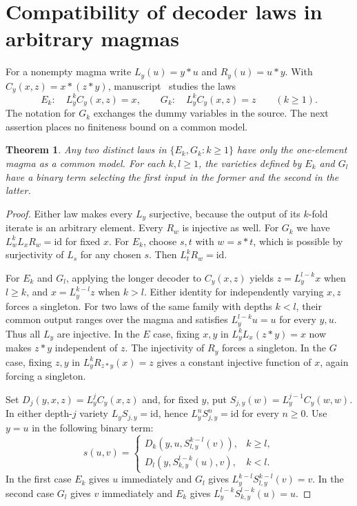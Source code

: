 \documentclass[11pt]{article}
\newtheorem{theorem}{Theorem}[section]
\begin{document}
\section{Compatibility of decoder laws in arbitrary magmas}
\label{sec:decoder}
For a nonempty magma write $L_y(u)=y*u$ and $R_y(u)=u*y$. With
$C_y(x,z)=x*(z*y)$, manuscript~\cite{vm085} studies the laws
\[
 E_k:\quad L_y^k C_y(x,z)=x,\qquad
 G_k:\quad L_y^k C_y(x,z)=z\qquad(k\ge1).
\]
The notation for $G_k$ exchanges the dummy variables in the source.
The next assertion places no finiteness bound on a common model.

\begin{theorem}
Any two distinct laws in $\{E_k,G_k:k\ge1\}$ have only the one-element
magma as a common model. For each $k,l\ge1$, the varieties defined by
$E_k$ and $G_l$ have a binary term selecting the first input in the
former and the second in the latter.
\end{theorem}
\begin{proof}
Either law makes every $L_y$ surjective, because the output of its
$k$-fold iterate is an arbitrary element. Every $R_w$ is injective
as well. For $G_k$ we have $L_w^k L_x R_w=\mathrm{id}$ for fixed
$x$. For $E_k$, choose $s,t$ with $w=s*t$, which is possible by
surjectivity of $L_s$ for any chosen $s$. Then
$L_t^k R_w=\mathrm{id}$.

For $E_k$ and $G_l$, applying the longer decoder to $C_y(x,z)$ yields
$z=L_y^{l-k}x$ when $l\ge k$, and $x=L_y^{k-l}z$ when $k>l$.
Either identity for independently varying $x,z$ forces a singleton.
For two laws of the same family with depths $k<l$, their common
output ranges over the magma and satisfies $L_y^{l-k}u=u$ for every
$y,u$. Thus all $L_y$ are injective. In the $E$ case, fixing $x,y$
in $L_y^k L_x(z*y)=x$ now makes $z*y$ independent of $z$.
The injectivity of $R_y$ forces a singleton. In the $G$ case, fixing
$z,y$ in $L_y^k R_{z*y}(x)=z$ gives a constant injective function
of $x$, again forcing a singleton.

Set $D_j(y,x,z)=L_y^j C_y(x,z)$ and, for fixed $y$, put
$S_{j,y}(w)=L_y^{j-1}C_y(w,w)$. In either depth-$j$ variety
$L_yS_{j,y}=\mathrm{id}$, hence $L_y^n S_{j,y}^n=\mathrm{id}$ for
every $n\ge0$. Use $y=u$ in the following binary term:
\[
 s(u,v)=
 \begin{cases}
 D_k(y,u,S_{l,y}^{k-l}(v)),& k\ge l,\\
 D_l(y,S_{k,y}^{l-k}(u),v),& k<l.
 \end{cases}
\]
In the first case $E_k$ gives $u$ immediately and $G_l$ gives
$L_y^{k-l}S_{l,y}^{k-l}(v)=v$. In the second case $G_l$ gives $v$
immediately and $E_k$ gives $L_y^{l-k}S_{k,y}^{l-k}(u)=u$.
\end{proof}
\end{document}
